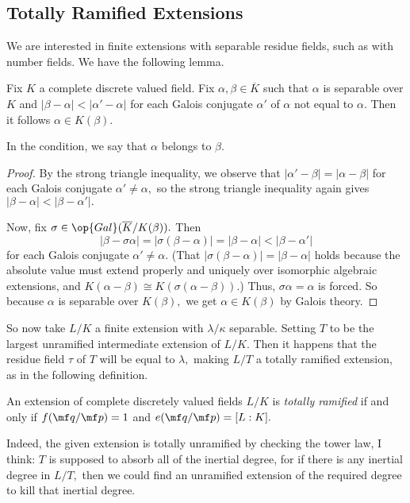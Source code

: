 \documentclass[../notes.tex]{subfiles}
\begin{document}
\subsection{Totally Ramified Extensions}
We are interested in finite extensions with separable residue fields, such as with number fields. We have the following lemma.
\begin{lem}[Krasner's]
	Fix $K$ a complete discrete valued field. Fix $\alpha,\beta\in\overline K$ such that $\alpha$ is separable over $K$ and $|\beta-\alpha|<|\alpha'-\alpha|$ for each Galois conjugate $\alpha'$ of $\alpha$ not equal to $\alpha.$ Then it follows $\alpha\in K(\beta).$
\end{lem}
\begin{remark}
	In the condition, we say that $\alpha$ belongs to $\beta.$
\end{remark}
\begin{proof}
	By the strong triangle inequality, we observe that $|\alpha'-\beta|=|\alpha-\beta|$ for each Galois conjugate $\alpha'\ne\alpha,$ so the strong triangle inequality again gives $|\beta-\alpha|<|\beta-\alpha'|.$

	Now, fix $\sigma\in\op{Gal}(\overline K/K(\beta)).$ Then
	\[|\beta-\sigma\alpha|=|\sigma(\beta-\alpha)|=|\beta-\alpha|<|\beta-\alpha'|\]
	for each Galois conjugate $\alpha'\ne\alpha.$ (That $|\sigma(\beta-\alpha)|=|\beta-\alpha|$ holds because the absolute value must extend properly and uniquely over isomorphic algebraic extensions, and $K(\alpha-\beta)\cong K(\sigma(\alpha-\beta)).$) Thus, $\sigma\alpha=\alpha$ is forced. So because $\alpha$ is separable over $K(\beta),$ we get $\alpha\in K(\beta)$ by Galois theory.
\end{proof}
So now take $L/K$ a finite extension with $\lambda/\kappa$ separable. Setting $T$ to be the largest unramified intermediate extension of $L/K.$ Then it happens that the residue field $\tau$ of $T$ will be equal to $\lambda,$ making $L/T$ a totally ramified extension, as in the following definition.
\begin{definition}
	An extension of complete discretely valued fields $L/K$ is \textit{totally ramified} if and only if $f(\mf q/\mf p)=1$ and $e(\mf q/\mf p)=[L:K].$
\end{definition}
Indeed, the given extension is totally unramified by checking the tower law, I think: $T$ is supposed to absorb all of the inertial degree, for if there is any inertial degree in $L/T,$ then we could find an unramified extension of the required degree to kill that inertial degree.
\end{document}
